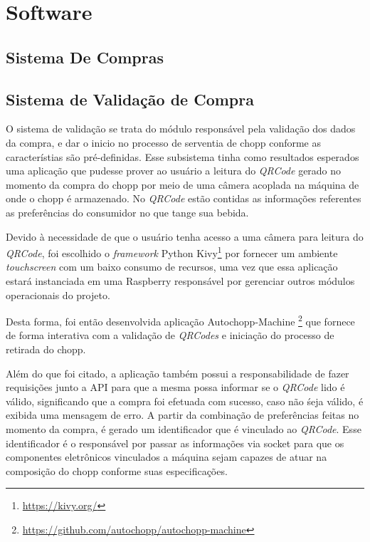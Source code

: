 \chapter[Software]{Software}
    
    \section[Sistema De Compras]{Sistema De Compras}
    
    \section[Sistema de Validação de Compra]{Sistema de Validação de Compra}
        
        O sistema de validação se trata do módulo responsável pela validação dos dados da compra,
        e dar o inicio no processo de serventia de chopp conforme as característias são pré-definidas.
        Esse subsistema tinha como resultados esperados uma aplicação que pudesse prover ao usuário
        a leitura do \textit{QRCode} gerado no momento da compra do chopp por meio de uma câmera 
        acoplada na máquina de onde o chopp é armazenado. No \textit{QRCode} estão contidas as informações
        referentes as preferências do consumidor no que tange sua bebida.
        
        Devido à necessidade de que o usuário tenha acesso a uma câmera para leitura do \textit{QRCode},
        foi escolhido o \textit{framework} Python Kivy\footnote{\url{https://kivy.org/}} por fornecer um ambiente
        \textit{touchscreen} com um baixo consumo de recursos, uma vez que essa aplicação estará 
        instanciada em uma Raspberry responsável por gerenciar outros módulos operacionais do projeto.

        Desta forma, foi então desenvolvida aplicação Autochopp-Machine \footnote{\url{https://github.com/autochopp/autochopp-machine}} que fornece de forma interativa 
        com a validação de \textit{QRCodes} e iniciação do processo de retirada do chopp. 

        Além do que foi citado, a aplicação também possui a responsabilidade de fazer requisições junto a API
        para que a mesma possa informar se o \textit{QRCode} lido é válido, significando que a compra foi 
        efetuada com sucesso, caso não śeja válido, é exibida uma mensagem de erro. A partir da combinação
        de preferências feitas no momento da compra, é gerado um identificador que é vinculado ao 
        \textit{QRCode}. Esse identificador é o responsável por passar as informações via socket para que
        os componentes eletrônicos vinculados a máquina sejam capazes de atuar na composição do chopp conforme
        suas especificações.


